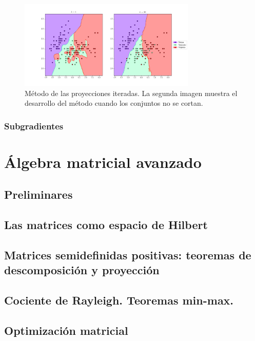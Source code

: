\documentclass{book}
\begin{document}
\begin{figure}[h]
	\centering
	\includegraphics[width=0.75\textwidth]{./images/compare_knn.png}
	\caption{Método de las proyecciones iteradas. La segunda imagen muestra el desarrollo del método cuando los conjuntos no se cortan.} \label{fig:iterproj}
\end{figure}

\subsection{Subgradientes}



\chapter{Álgebra matricial avanzado}

\section{Preliminares}

\section{Las matrices como espacio de Hilbert}

\section{Matrices semidefinidas positivas: teoremas de descomposición y proyección}

\section{Cociente de Rayleigh. Teoremas min-max.}

\section{Optimización matricial}
\end{document}

